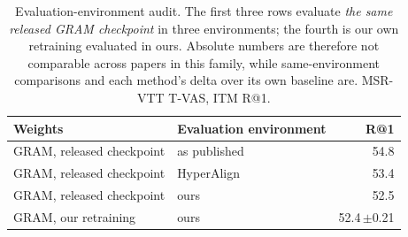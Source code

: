 \begin{table}[t]
\centering
\caption{Evaluation-environment audit. The first three rows evaluate \emph{the same
released GRAM checkpoint} in three environments; the fourth is our own retraining
evaluated in ours. Absolute numbers are therefore not comparable across papers in this
family, while same-environment comparisons and each method's delta over its own baseline
are. MSR-VTT T-VAS, ITM R@1.}
\label{tab:envaudit}
\small
\begin{tabular}{llr}
\toprule
Weights & Evaluation environment & R@1 \\
\midrule
GRAM, released checkpoint & as published & 54.8 \\
GRAM, released checkpoint & HyperAlign & 53.4 \\
GRAM, released checkpoint & ours & 52.5 \\
GRAM, our retraining & ours & 52.4\,\tiny{$\pm$0.21} \\
\bottomrule
\end{tabular}
\end{table}
